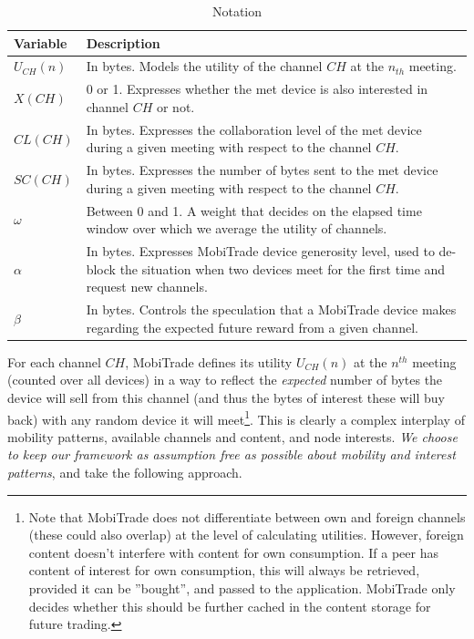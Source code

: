 \begin{table}
\caption{Notation}
\centering
\label{table:notation}
\footnotesize
\begin{tabular}{|p{2cm}||p{10cm}|}
\hline
\bfseries Variable & \bfseries Description\\
\hline
$U_{CH}(n)$ & In bytes. Models the utility of the channel $CH$ at the $n_{th}$ meeting.\\
\hline
$X(CH)$ & 0 or 1. Expresses whether the met device is also interested in channel $CH$ or not.\\
\hline
$CL(CH)$   & In bytes. Expresses the collaboration level of the met device during a given meeting with respect to the channel $CH$.\\
\hline
$SC(CH)$   & In bytes. Expresses the number of bytes sent to the met device during a given meeting with respect to the channel $CH$.\\
\hline
$\omega$ & Between 0 and 1. A weight that decides on the elapsed time window over which we average the utility of channels.\\
\hline
$\alpha$ & In bytes. Expresses MobiTrade device generosity level, used to de-block the situation when two devices meet for the first time and request new channels.\\
\hline
$\beta$ & In bytes. Controls the speculation that a MobiTrade device makes regarding the expected future reward from a given channel.\\
\hline
\end{tabular}
\end{table}

For each channel $CH$, MobiTrade defines its utility $U_{CH}(n)$ at the $n^{th}$ meeting (counted over all devices) in a way to reflect the \emph{expected} number of bytes the device will sell from this channel (and thus the bytes of interest these will buy back) with any random device it will meet\footnote{Note that MobiTrade does not differentiate between own and foreign channels (these could also overlap) at the level of calculating utilities. However, foreign content doesn't interfere with content for own consumption. If a peer has content of interest for own consumption, this will always be retrieved, provided it can be ''bought'', and passed to the application. MobiTrade only decides whether this should be further cached in the content storage for future trading.}. This is clearly a complex interplay of mobility patterns, available channels and content, and node interests. \emph{We choose to keep our framework as assumption free as possible about mobility and interest patterns}, and take the following approach.

